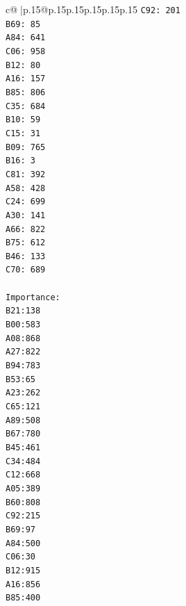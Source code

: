 \documentclass{article}
\begin{document}
{\begin{supertabular}{c@{$\;$}|p{.15\linewidth}@{}p{.15\linewidth}p{.15\linewidth}p{.15\linewidth}p{.15\linewidth}p{.15\linewidth}}
{{{\texttt{C92: 201} \\
\texttt{B69: 85} \\
\texttt{A84: 641} \\
\texttt{C06: 958} \\
\texttt{B12: 80} \\
\texttt{A16: 157} \\
\texttt{B85: 806} \\
\texttt{C35: 684} \\
\texttt{B10: 59} \\
\texttt{C15: 31} \\
\texttt{B09: 765} \\
\texttt{B16: 3} \\
\texttt{C81: 392} \\
\texttt{A58: 428} \\
\texttt{C24: 699} \\
\texttt{A30: 141} \\
\texttt{A66: 822} \\
\texttt{B75: 612} \\
\texttt{B46: 133} \\
\texttt{C70: 689} \\
\\ 
\texttt{Importance:} \\
\texttt{B21:138} \\
\texttt{B00:583} \\
\texttt{A08:868} \\
\texttt{A27:822} \\
\texttt{B94:783} \\
\texttt{B53:65} \\
\texttt{A23:262} \\
\texttt{C65:121} \\
\texttt{A89:508} \\
\texttt{B67:780} \\
\texttt{B45:461} \\
\texttt{C34:484} \\
\texttt{C12:668} \\
\texttt{A05:389} \\
\texttt{B60:808} \\
\texttt{C92:215} \\
\texttt{B69:97} \\
\texttt{A84:500} \\
\texttt{C06:30} \\
\texttt{B12:915} \\
\texttt{A16:856} \\
\texttt{B85:400} \\
}}}
\end{supertabular}}
\end{document}
